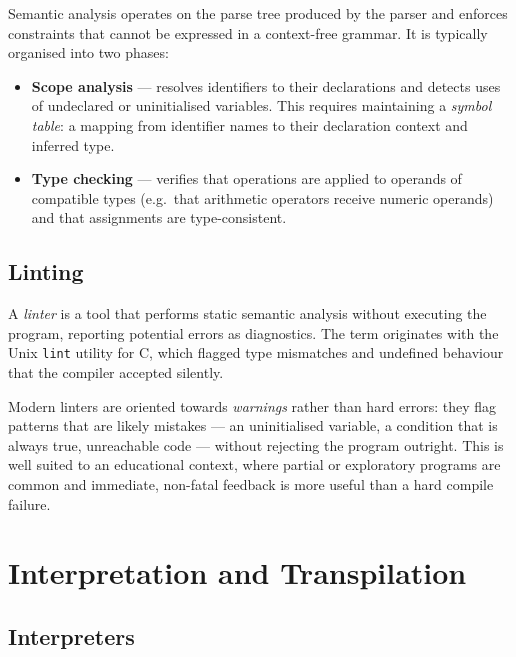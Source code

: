 Semantic analysis operates on the parse tree produced by the parser and
enforces constraints that cannot be expressed in a context-free grammar.  It
is typically organised into two phases:

\begin{itemize}
  \item \textbf{Scope analysis} --- resolves identifiers to their declarations
        and detects uses of undeclared or uninitialised variables.  This
        requires maintaining a \textit{symbol table}: a mapping from identifier
        names to their declaration context and inferred type.

  \item \textbf{Type checking} --- verifies that operations are applied to
        operands of compatible types (e.g.\ that arithmetic operators receive
        numeric operands) and that assignments are type-consistent.
\end{itemize}

\subsection{Linting}

A \textit{linter} is a tool that performs static semantic analysis without
executing the program, reporting potential errors as diagnostics.  The term
originates with the Unix \texttt{lint} utility for C, which flagged type
mismatches and undefined behaviour that the compiler accepted silently.

Modern linters are oriented towards \textit{warnings} rather than hard errors:
they flag patterns that are likely mistakes --- an uninitialised variable, a
condition that is always true, unreachable code --- without rejecting the
program outright.  This is well suited to an educational context, where partial
or exploratory programs are common and immediate, non-fatal feedback is more
useful than a hard compile failure.

\section{Interpretation and Transpilation}
\label{sec:interpretation-transpilation}

\subsection{Interpreters}

